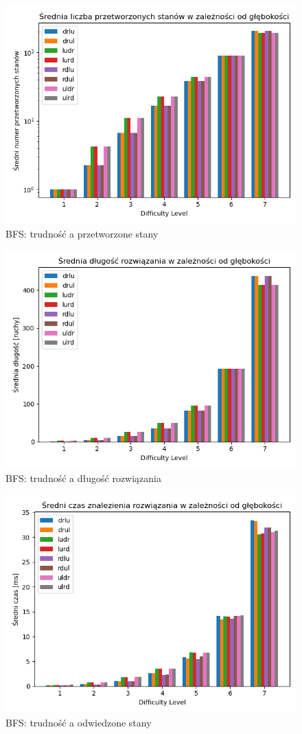 \documentclass{classrep}
\begin{document}
\begin{figure}[p] \centering
 \includegraphics[width=0.9\linewidth]{./pic/bfs_proc_c_vs_diff.png}
 \caption{BFS: trudność a przetworzone stany}
\end{figure}
\begin{figure}[p] \centering
 \includegraphics[width=0.9\linewidth]{./pic/bfs_sol_len_vs_diff.png}
 \caption{BFS: trudność a długość rozwiązania}
\end{figure}
\begin{figure}[p] \centering
 \includegraphics[width=0.9\linewidth]{./pic/bfs_time_vs_diff.png}
 \caption{BFS: trudność a odwiedzone stany}
\end{figure}
\end{document}
